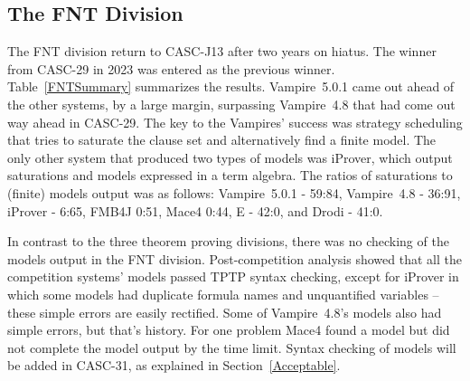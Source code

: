 \documentclass[aic]{iosart2x}
\newcommand{\THIS}{\mbox{CASC-J13}}
\newcommand{\NEXT}{\mbox{CASC-31}}
\begin{document}

\subsection{The FNT Division}
\label{FNT}

The FNT division return to \THIS{} after two years on hiatus.
The winner from CASC-29 in 2023 was entered as the previous winner.
Table~\ref{FNTSummary} summarizes the results.
Vampire~5.0.1 came out ahead of the other systems, by a large margin, surpassing Vampire~4.8
that had come out way ahead in CASC-29.
The key to the Vampires' success was strategy scheduling that tries to saturate the clause
set and alternatively find a finite model.
The only other system that produced two types of models was iProver, which output saturations 
and models expressed in a term algebra.
The ratios of saturations to (finite) models output was as follows:
Vampire~5.0.1 - 59:84, 
Vampire~4.8 - 36:91,
iProver - 6:65,
FMB4J 0:51,
Mace4 0:44,
E - 42:0,
and
Drodi - 41:0.

In contrast to the three theorem proving divisions, there was no checking of the models output
in the FNT division.
Post-competition analysis showed that all the competition systems' models passed TPTP syntax 
checking, except for iProver in which some models had duplicate formula names and unquantified 
variables -- these simple errors are easily rectified.
Some of Vampire~4.8's models also had simple errors, but that's history.
For one problem Mace4 found a model but did not complete the model output by the time limit.
Syntax checking of models will be added in \NEXT{}, as explained in Section~\ref{Acceptable}.
\end{document}
